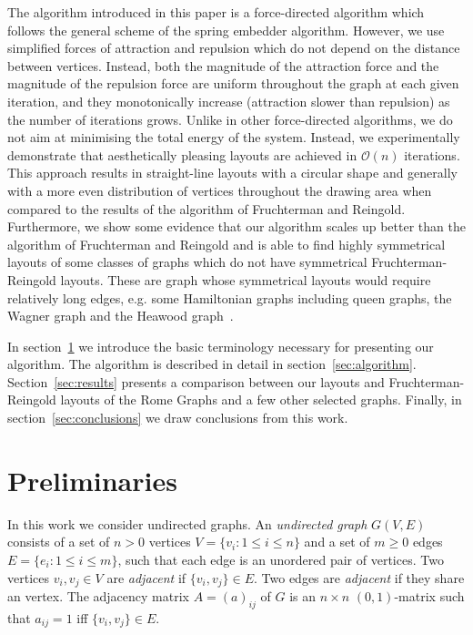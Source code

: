\documentclass{llncs}
\begin{document}
The algorithm introduced in this paper is a force-directed algorithm which follows the general scheme of the spring embedder algorithm. However, we use simplified forces of attraction and repulsion which do not depend on the distance between vertices. Instead, both the magnitude of the attraction force and the magnitude of the repulsion force are uniform throughout the graph at each given iteration, and they monotonically increase (attraction slower than repulsion) as the number of iterations grows. Unlike in other force-directed algorithms, we do not aim at minimising the total energy of the system. Instead, we experimentally demonstrate that aesthetically pleasing layouts are achieved in $\mathcal{O}(n)$ iterations. This approach results in straight-line layouts with a circular shape and generally with a more even distribution of vertices throughout the drawing area when compared to the results of the algorithm of Fruchterman and Reingold. Furthermore, we show some evidence that our algorithm scales up better than the algorithm of Fruchterman and Reingold and is able to find highly symmetrical layouts of some classes of graphs which do not have symmetrical Fruchterman-Reingold layouts. These are graph whose symmetrical layouts would require relatively long edges, e.g. some Hamiltonian graphs including queen graphs, the Wagner graph and the Heawood graph~\cite{Weisstein2015}.

In section~\ref{sec:preliminaries} we introduce the basic terminology necessary for presenting our algorithm. The algorithm is described in detail in section~\ref{sec:algorithm}. Section~\ref{sec:results} presents a comparison between our layouts and Fruchterman-Reingold layouts of the Rome Graphs and a few other selected graphs. Finally, in section~\ref{sec:conclusions} we draw conclusions from this work.

\section{Preliminaries}\label{sec:preliminaries}

In this work we consider undirected graphs. An \emph{undirected graph} $G(V, E)$ consists of a set of $n>0$ vertices $V = \{v_i: 1\le i \le n\}$ and a set of $ m \ge 0$ edges $E=\{e_i: 1 \leq i \leq m\}$, such that each edge is an unordered pair of vertices. Two vertices $v_i, v_j \in V$ are \emph{adjacent} if $\{v_i, v_j\} \in E$. Two edges are \emph{adjacent} if they share an vertex. The adjacency matrix $A=(a)_{ij}$ of $G$ is an $n \times n$ $(0,1)$-matrix such that $a_{ij} = 1$ iff $\{v_i, v_j\} \in E$.
\end{document}
